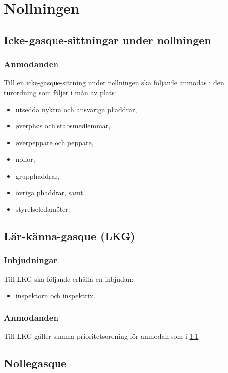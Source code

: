 \documentclass{dsekprotokoll}
\begin{document}
\section{Nollningen}

\subsection{Icke-gasque-sittningar under nollningen} \label{icke-gasque}

\subsubsection{Anmodanden}
Till en icke-gasque-sittning under nollningen ska följande
anmodas i den turordning som följer i mån av plats:

\begin{itemize}
    \item utsedda nyktra och ansvariga phaddrar,
    \item øverphøs och stabsmedlemmar,
    \item øverpeppare och peppare,
    \item nollor,
    \item grupphaddrar,
    \item övriga phaddrar, samt
    \item styrelseledamöter.
\end{itemize}

\subsection{Lär-känna-gasque (LKG)}

\subsubsection{Inbjudningar}
Till LKG ska följande erhålla en inbjudan:
\begin{itemize}
    \item inspektorn och inspektrix.
\end{itemize}

\subsubsection{Anmodanden}
Till LKG gäller samma prioritetsordning för anmodan som
i \ref{icke-gasque}


\subsection{Nollegasque}
\end{document}
